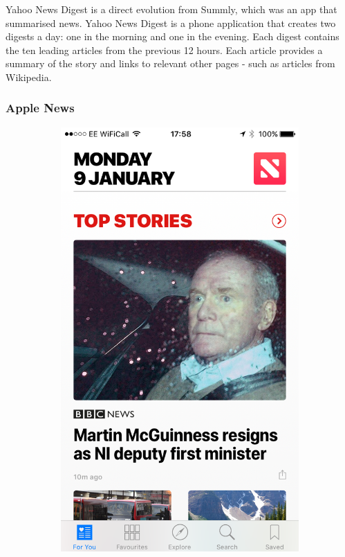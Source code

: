 \documentclass[12pt]{article}
\begin{document}
Yahoo News Digest\cite{yahooNewsDigest} is a direct evolution from Summly\cite{summly}, which was an app that summarised news. Yahoo News Digest is a phone application that creates two digests a day: one in the morning and one in the evening. Each digest contains the ten leading articles from the previous 12 hours. Each article provides a summary of the story and links to relevant other pages - such as articles from Wikipedia\cite{wikipedia}.

\subsubsection{Apple News}

\begin{figure}[ht!]
  \centering
  \begin{subfigure}[t]{0.3\textwidth}
        \includegraphics[width=\textwidth]{AppleHome.PNG}

\end{subfigure}
\end{figure}
\end{document}
